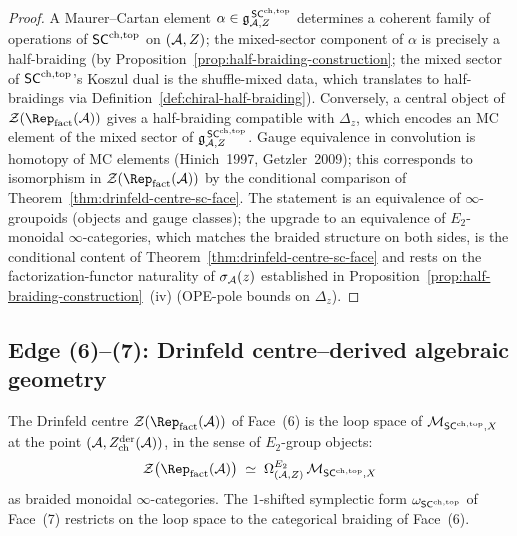 \begin{proof}
A Maurer--Cartan element $\alpha\in\mathfrak{g}^{\,\mathsf{SC}^{\mathrm{ch},\mathrm{top}}}_{\mathcal{A},Z}$
determines a coherent family of operations of $\mathsf{SC}^{\mathrm{ch},\mathrm{top}}$ on
$(\mathcal{A},Z)$; the mixed-sector component of $\alpha$ is precisely a
half-braiding (by Proposition~\ref{prop:half-braiding-construction};
the mixed sector of $\mathsf{SC}^{\mathrm{ch},\mathrm{top}}$'s Koszul dual is the shuffle-mixed
data, which translates to half-braidings via
Definition~\ref{def:chiral-half-braiding}). Conversely, a central
object of $\cZ(\Rep_{\mathrm{fact}}(\cA))$ gives a half-braiding
compatible with $\Delta_z$, which encodes an MC element of the
mixed sector of $\mathfrak{g}^{\,\mathsf{SC}^{\mathrm{ch},\mathrm{top}}}_{\mathcal{A},Z}$. Gauge equivalence in
convolution is homotopy of MC elements
(Hinich~1997, Getzler~2009); this corresponds to isomorphism in
$\cZ(\Rep_{\mathrm{fact}}(\cA))$ by the conditional comparison of
Theorem~\ref{thm:drinfeld-centre-sc-face}.
The statement is an equivalence of $\infty$-groupoids
(objects and gauge classes); the upgrade to an equivalence of
$E_2$-monoidal $\infty$-categories, which matches the braided
structure on both sides, is the conditional content of
Theorem~\ref{thm:drinfeld-centre-sc-face} and rests on the
factorization-functor naturality of $\sigma_{\mathcal{A}}(z)$ established in
Proposition~\ref{prop:half-braiding-construction}~(iv) (OPE-pole
bounds on $\Delta_z$).
\end{proof}

\subsection{Edge (6)--(7): Drinfeld centre--derived algebraic geometry}\label{subsec:edge-67}

\begin{theorem}\label{thm:edge-67}%
The Drinfeld centre $\cZ(\Rep_{\mathrm{fact}}(\cA))$ of Face~(6)
is the loop space of $\mathcal{M}_{\mathsf{SC}^{\mathrm{ch},\mathrm{top}},X}$ at the point
$(\mathcal{A},Z^{\mathrm{der}}_{\mathrm{ch}}(\mathcal{A}))$, in the sense of
$E_2$-group objects:
\begin{equation}
 \label{eq:edge-67-equivalence}
 \cZ\bigl(\Rep_{\mathrm{fact}}(\cA)\bigr)
 \;\simeq\;
 \Omega_{(\cA,Z)}^{E_2}\,\cM_{\SCchtop,X}
\end{equation}
as braided monoidal $\infty$-categories. The $1$-shifted symplectic
form $\omega_{\mathsf{SC}^{\mathrm{ch},\mathrm{top}}}$ of Face~(7) restricts on the loop space to
the categorical braiding of Face~(6).
\end{theorem}

